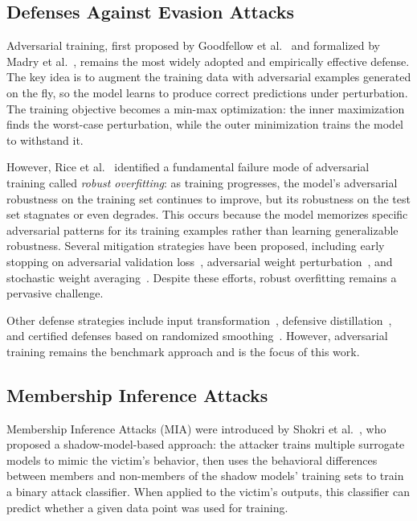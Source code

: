\documentclass[conference]{IEEEtran}
\begin{document}
\subsection{Defenses Against Evasion Attacks}

Adversarial training, first proposed by Goodfellow et al.~\cite{goodfellow2015explaining} and formalized by Madry et al.~\cite{madry2018towards}, remains the most widely adopted and empirically effective defense. The key idea is to augment the training data with adversarial examples generated on the fly, so the model learns to produce correct predictions under perturbation. The training objective becomes a min-max optimization: the inner maximization finds the worst-case perturbation, while the outer minimization trains the model to withstand it.

However, Rice et al.~\cite{rice2020overfitting} identified a fundamental failure mode of adversarial training called \textit{robust overfitting}: as training progresses, the model's adversarial robustness on the training set continues to improve, but its robustness on the test set stagnates or even degrades. This occurs because the model memorizes specific adversarial patterns for its training examples rather than learning generalizable robustness. Several mitigation strategies have been proposed, including early stopping on adversarial validation loss~\cite{rice2020overfitting}, adversarial weight perturbation~\cite{wu2020adversarial}, and stochastic weight averaging~\cite{chen2021robust}. Despite these efforts, robust overfitting remains a pervasive challenge.

Other defense strategies include input transformation~\cite{guo2018countering}, defensive distillation~\cite{papernot2016distillation}, and certified defenses based on randomized smoothing~\cite{cohen2019certified}. However, adversarial training remains the benchmark approach and is the focus of this work.

\subsection{Membership Inference Attacks}

Membership Inference Attacks (MIA) were introduced by Shokri et al.~\cite{shokri2017membership}, who proposed a shadow-model-based approach: the attacker trains multiple surrogate models to mimic the victim's behavior, then uses the behavioral differences between members and non-members of the shadow models' training sets to train a binary attack classifier. When applied to the victim's outputs, this classifier can predict whether a given data point was used for training.
\end{document}
